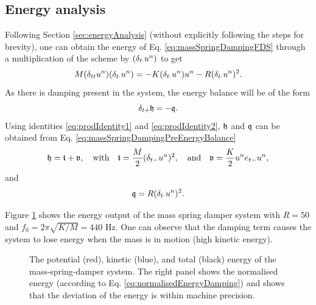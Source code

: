 \subsection{Energy analysis}
Following Section \ref{sec:energyAnalysis} (without explicitly following the steps for brevity), one can obtain the energy of Eq. \eqref{eq:massSpringDampingFDS} through a multiplication of the scheme by $(\delta_{t\cdot} u^n)$ to get
\begin{equation}\label{eq:massSpringDampingPreEnergyBalance}
    M(\delta_{tt} u^n)(\delta_{t\cdot} u^n) = -K(\delta_{t\cdot} u^n)u^n - R(\delta_{t\cdot} u^n)^2.
\end{equation}
As there is damping present in the system, the energy balance will be of the form 
\begin{equation*}
    \delta_{t+} \mathfrak{h} = -\mathfrak{q}.
\end{equation*}
Using identities \eqref{eq:prodIdentity1} and \eqref{eq:prodIdentity2}, $\mathfrak{h}$ and $\mathfrak{q}$ can be obtained from Eq. \eqref{eq:massSpringDampingPreEnergyBalance} 
\begin{equation}\label{eq:energyBalanceMassSpringDamper}
    \mathfrak{h} = \mathfrak{t} + \mathfrak{v}, \quad \text{with} \quad
    \mathfrak{t} = \frac{M}{2}(\delta_{t-}u^n)^2, \quad \text{and} \quad \mathfrak{v} = \frac{K}{2}u^n e_{t-}u^n,
\end{equation} 
and
\begin{equation}\label{eq:massDampingEnergy}
    \mathfrak{q} = R(\delta_{t\cdot} u^n)^2.
\end{equation}

Figure \ref{fig:massSpringDamperEnergy} shows the energy output of the mass spring damper system with $R = 50$ and $f_0 = 2\pi\sqrt{K/M} = 440$ Hz. One can observe that the damping term causes the system to lose energy when the mass is in motion (high kinetic energy).
\begin{figure}[h]
    \centering
      \caption{The potential (red), kinetic (blue), and total (black) energy of the mass-spring-damper system. The right panel shows the normalised energy (according to Eq. \eqref{eq:normalisedEnergyDamping}) and shows that the deviation of the energy is within machine precision. \label{fig:massSpringDamperEnergy}}
\end{figure}

